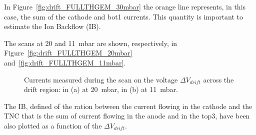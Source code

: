 \documentclass[a4paper, 11 pt]{report}
\newcommand{\Vdrift}{$ \Delta V_{drift}$}
\begin{document}
In Figure~\ref{fig:drift_FULLTHGEM_30mbar} the orange line represents, in this case, the sum of the cathode 
and bot1 currents. This quantity is important to estimate the Ion Backflow (IB). 

The scans at 20 and 11~mbar are shown, respectively, in Figure~\ref{fig:drift_FULLTHGEM_20mbar} and~\ref{fig:drift_FULLTHGEM_11mbar}.
\begin{figure}[!htb]
	\centering
	\caption{Currents measured during the scan on the voltage \Vdrift{} across the drift region: in 
	(a) at 20~mbar, in (b) at 11~mbar.}
	\label{fig:drift_FULLTHGEM_other_pressure}
\end{figure}
The IB, defined of the ration between the current flowing in the cathode and the TNC that is the sum
of current flowing in the anode and in the top3, have been also plotted as a function of the \Vdrift.
\end{document}

